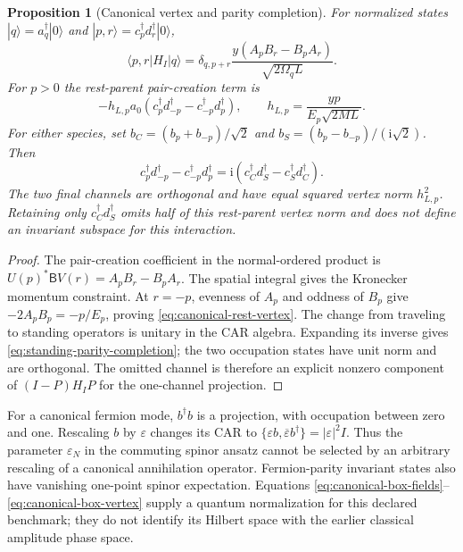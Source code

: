 \documentclass[11pt,a4paper,oneside]{book}
\theoremstyle{plain}
\newtheorem{proposition}[theorem]{Proposition}
\theoremstyle{definition}
\theoremstyle{remark}
\newcommand{\ii}{\mathrm i}
\newcommand{\src}[2]{\cite{#1}}
\begin{document}
\begin{proposition}[Canonical vertex and parity completion]
\label{prop:canonical-box-vertex}
For normalized states $|q\rangle=a_q^\dagger|0\rangle$ and
$|p,r\rangle=c_p^\dagger d_r^\dagger|0\rangle$,
\begin{equation}
 \langle p,r|H_I|q\rangle
 =\delta_{q,p+r}\frac{y(A_pB_r-B_pA_r)}{\sqrt{2\Omega_qL}}.
 \label{eq:canonical-box-vertex}
\end{equation}
For $p>0$ the rest-parent pair-creation term is
\begin{equation}
 -h_{L,p}a_0(c_p^\dagger d_{-p}^\dagger
                    -c_{-p}^\dagger d_p^\dagger),\qquad
 h_{L,p}=\frac{yp}{E_p\sqrt{2ML}}.
 \label{eq:canonical-rest-vertex}
\end{equation}
For either species, set
$b_C=(b_p+b_{-p})/\sqrt2$ and
$b_S=(b_p-b_{-p})/(\ii\sqrt2)$.  Then
\begin{equation}
 c_p^\dagger d_{-p}^\dagger-c_{-p}^\dagger d_p^\dagger
 =\ii(c_C^\dagger d_S^\dagger-c_S^\dagger d_C^\dagger).
 \label{eq:standing-parity-completion}
\end{equation}
The two final channels are orthogonal and have equal squared vertex
norm $h_{L,p}^2$.  Retaining only $c_C^\dagger d_S^\dagger$ omits half
of this rest-parent vertex norm and does not define an invariant
subspace for this interaction.
\end{proposition}
\begin{proof}
The pair-creation coefficient in the normal-ordered product is
$U(p)^*\mathsf B V(r)=A_pB_r-B_pA_r$.  The spatial integral gives the
Kronecker momentum constraint.  At $r=-p$, evenness of $A_p$ and
oddness of $B_p$ give $-2A_pB_p=-p/E_p$, proving
\eqref{eq:canonical-rest-vertex}.  The change from traveling to standing
operators is unitary in the CAR algebra.  Expanding its inverse gives
\eqref{eq:standing-parity-completion}; the two occupation states have
unit norm and are orthogonal.  The omitted channel is therefore an
explicit nonzero component of $(I-P)H_IP$ for the one-channel projection.
\end{proof}
\src{R20}{thm:v20v43-vertex,thm:v20v43-leak,cor:v20v43-nonclosure}

For a canonical fermion mode, $b^\dagger b$ is a projection, with
occupation between zero and one.  Rescaling $b$ by $\varepsilon$ changes
its CAR to $\{\varepsilon b,\overline\varepsilon b^\dagger\}
=|\varepsilon|^2I$.  Thus the parameter $\varepsilon_N$ in the
commuting spinor ansatz cannot be selected by an arbitrary rescaling
of a canonical annihilation operator.  Fermion-parity invariant states
also have vanishing one-point spinor expectation.  Equations
\eqref{eq:canonical-box-fields}--\eqref{eq:canonical-box-vertex} supply
a quantum normalization for this declared benchmark; they do not
identify its Hilbert space with the earlier classical amplitude phase
space.\src{R20}{prop:v20v43-epsilon}
\end{document}
